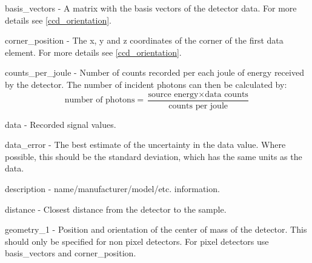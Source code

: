 \documentclass[usletter,11pt]{article}
\newcommand{\member}[2]
{ \noindent
{ \color{softBlue}  #1 - } #2
\vspace{0.2cm}
}
\begin{document}
\member{basis\_vectors}{A matrix with the basis vectors of the
  detector data. For more details see \ref{ccd_orientation}.
}

\member{corner\_position}{The x, y and z coordinates of the corner of
  the first data element. For more details see \ref{ccd_orientation}.
}

\member{counts\_per\_joule}{Number of counts recorded per each joule of
  energy received by the detector. The number of incident photons can
  then be calculated by:
\begin{equation*}
\text{number of photons} = \frac{\text{source energy} \times \text{data counts}}{\text{counts per joule}}
\end{equation*}
}

\member{data}{Recorded signal values.}

\member{data\_error}{The best estimate of the uncertainty in the data
 value. Where possible, this should be the standard deviation, which
 has the same units as the data.}

\member{description}{name/manufacturer/model/etc. information.}

\member{distance}{Closest distance from the detector to
the sample.}

\member{geometry\_1}{Position and orientation of the center of mass of
  the detector. This should only be specified for non pixel
  detectors. For pixel detectors use basis\_vectors and
  corner\_position.}
\end{document}
